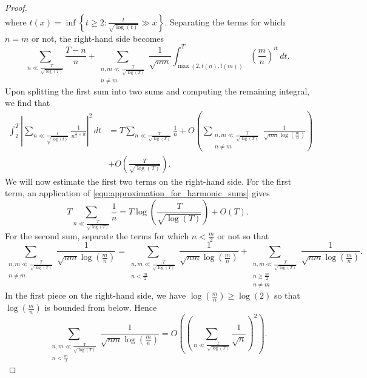 \documentclass[12pt]{article}
\begin{document}
\begin{proof}
\[        \]
        where \(t(x) = \inf\left\{t \ge 2:\frac{t}{\sqrt{\log(t)}} \gg x\right\}\). Separating the terms for which \(n = m\) or not, the right-hand side becomes
        \[
          \sum_{n \ll \frac{T}{\sqrt{\log(T)}}}\frac{T-n}{n}+ \sum_{\substack{n,m \ll \frac{T}{\sqrt{\log(T)}} \\ n \neq m}}\frac{1}{\sqrt{nm}}\int_{\max(2,t(n),t(m))}^{T}\left(\frac{m}{n}\right)^{it}\,dt.
        \]
        Upon splitting the first sum into two sums and computing the remaining integral, we find that
        \begin{equation}\label{equ:second_moment_zeta_asymptotic_equivalence_4}
          \begin{aligned}
            \int_{2}^{T}\left|\sum_{n \ll \frac{t}{\sqrt{\log(t)}}}\frac{1}{n^{\frac{1}{2}+it}}\right|^{2}\,dt &= T\sum_{n \ll \frac{T}{\sqrt{\log(T)}}}\frac{1}{n}+O\left(\sum_{\substack{n,m \ll \frac{T}{\sqrt{\log(T)}} \\ n \neq m}}\frac{1}{\sqrt{nm}\log\left(\frac{m}{n}\right)}\right) \\
            &+ O\left(\frac{T}{\sqrt{\log(T)}}\right).
          \end{aligned}
        \end{equation}
        We will now estimate the first two terms on the right-hand side. For the first term, an application of \cref{equ:approximation_for_harmonic_sums} gives
        \begin{equation}\label{equ:second_moment_zeta_asymptotic_equivalence_5}
          T\sum_{n \ll \frac{T}{\sqrt{\log(T)}}}\frac{1}{n} = T\log\left(\frac{T}{\sqrt{\log(T)}}\right)+O(T).
        \end{equation}
        For the second sum, separate the terms for which \(n < \frac{m}{2}\) or not so that
        \[
          \sum_{\substack{n,m \ll \frac{T}{\sqrt{\log(T)}} \\ n \neq m}}\frac{1}{\sqrt{nm}\log\left(\frac{m}{n}\right)} = \sum_{\substack{n,m \ll \frac{T}{\sqrt{\log(T)}} \\ n < \frac{m}{2}}}\frac{1}{\sqrt{nm}\log\left(\frac{m}{n}\right)}+\sum_{\substack{n,m \ll \frac{T}{\sqrt{\log(T)}} \\ n \ge \frac{m}{2} \\ n \neq m}}\frac{1}{\sqrt{nm}\log\left(\frac{m}{n}\right)}.
        \]
        In the first piece on the right-hand side, we have \(\log\left(\frac{m}{n}\right) \ge \log\left(2\right)\) so that \(\log\left(\frac{m}{n}\right)\) is bounded from below. Hence
        \[
          \sum_{\substack{n,m \ll \frac{T}{\sqrt{\log(T)}} \\ n < \frac{m}{2}}}\frac{1}{\sqrt{nm}\log\left(\frac{m}{n}\right)} = O\left(\left(\sum_{n \ll \frac{T}{\sqrt{\log(T)}}}\frac{1}{\sqrt{n}}\right)^{2}\right).
\]
\end{proof}
\end{document}
